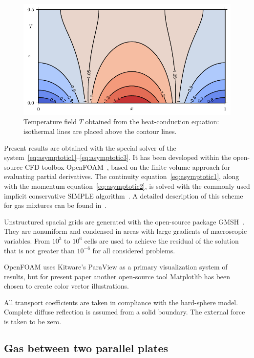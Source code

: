 \documentclass[smallextended, referee]{svjour3} %
\begin{document}
\begin{figure}[ht]
	\centering
	\includegraphics{Fig4}
	\caption{Temperature field \(T\) obtained from the heat-conduction equation:
		isothermal lines are placed above the contour lines.}
	\label{fig:moving:T_heat}
\end{figure}

Present results are obtained with the special solver of the system~\eqref{eq:asymptotic1}--\eqref{eq:asymptotic3}.
It has been developed within the open-source CFD toolbox OpenFOAM\textregistered{}~\cite{OpenFOAM1998},
based on the finite-volume approach for evaluating partial derivatives.
The continuity equation~\eqref{eq:asymptotic1}, along with the momentum equation~\eqref{eq:asymptotic2},
is solved with the commonly used implicit conservative SIMPLE algorithm~\cite{SIMPLE}.
A detailed description of this scheme for gas mixtures can be found in~\cite{Laneryd2007}.

Unstructured spacial grids are generated with the open-source package GMSH~\cite{GMSH}.
They are nonuniform and condensed in areas with large gradients of macroscopic variables.
From \(10^3\) to \(10^6\) cells are used to achieve the residual of the solution
that is not greater than \(10^{-6}\) for all considered problems.

OpenFOAM\textregistered{} uses Kitware's ParaView\textregistered{} as a primary visualization system of results,
but for present paper another open-source tool Matplotlib has been chosen to create color vector illustrations.

All transport coefficients are taken in compliance with the hard-sphere model.
Complete diffuse reflection is assumed from a solid boundary.
The external force is taken to be zero.

\subsection{Gas between two parallel plates}
\end{document}
